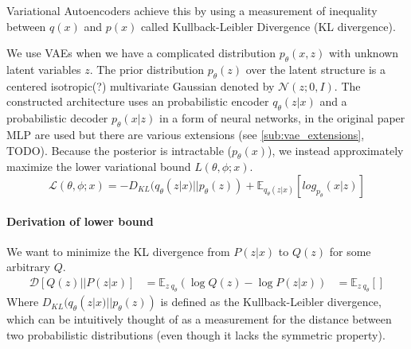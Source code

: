 \documentclass[twoside,11pt,a4paper]{article}
\theoremstyle{break}
\begin{document}
Variational Autoencoders achieve this by using a measurement of inequality between $q(x)$ and $p(x)$ called Kullback-Leibler Divergence (KL divergence).


We use VAEs when we have a complicated distribution $p_\theta(x,z)$ with unknown latent variables $z$.
The prior distribution $p_\theta(z)$ over the latent structure is a centered isotropic(?) multivariate Gaussian denoted by $\mathcal{N}(z;0, I)$.
The constructed architecture uses an probabilistic encoder $q_\theta(z|x)$ and a probabilistic decoder $p_\theta(x|z)$ in a form of neural networks, in the original paper MLP are used\cite{vae:2013} but there are various extensions (see \ref{sub:vae_extensions}, TODO).
Because the posterior is intractable ($p_\theta(x)$), we instead approximately maximize the lower variational bound $L(\theta,\phi;x)$.\\
\begin{equation}
  \mathcal{L}(\theta,\phi;x) = -D_{KL}(q_\theta(z|x)||p_\theta(z)) + \mathbb{E}_{q_\theta(z|x)}[log_{p_\theta}(x|z)]
\end{equation}
\paragraph{Derivation of lower bound}
We want to minimize the KL divergence from $P(z|x)$ to $Q(z)$ for some arbitrary $Q$.
  \begin{align*}
    \label{eq:der_lower_bound}
    \mathcal{D}[Q(z)||P(z|x)] &= \mathbb{E}_{z~q_\theta}(\log Q(z) - \log P(z|x))
    &= \mathbb{E}_{z ~ q_\theta}[]
  \end{align*}
Where $D_{KL}(q_\theta(z|x) || p_\theta(z))$ is defined as the Kullback-Leibler divergence, which can be intuitively thought of as a measurement for the distance between two probabilistic distributions (even though it lacks the symmetric property).
\end{document}
